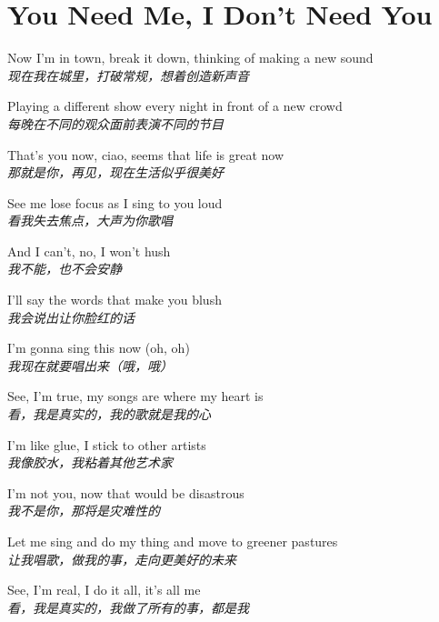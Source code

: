 \section{You Need Me, I Don't Need You}

\thispagestyle{empty}


\begin{spacing}{1.5}
\begin{flushleft}
Now I'm in town, break it down, thinking of making a new sound\\
\textit{现在我在城里，打破常规，想着创造新声音}\lyricspace

Playing a different show every night in front of a new crowd\\
\textit{每晚在不同的观众面前表演不同的节目}\lyricspace

That's you now, ciao, seems that life is great now\\
\textit{那就是你，再见，现在生活似乎很美好}\lyricspace

See me lose focus as I sing to you loud\\
\textit{看我失去焦点，大声为你歌唱}\lyricspace

And I can't, no, I won't hush\\
\textit{我不能，也不会安静}\lyricspace

I'll say the words that make you blush\\
\textit{我会说出让你脸红的话}\lyricspace

I'm gonna sing this now (oh, oh)\\
\textit{我现在就要唱出来（哦，哦）}\lyricspace

See, I'm true, my songs are where my heart is\\
\textit{看，我是真实的，我的歌就是我的心}\lyricspace

I'm like glue, I stick to other artists\\
\textit{我像胶水，我粘着其他艺术家}\lyricspace

I'm not you, now that would be disastrous\\
\textit{我不是你，那将是灾难性的}\lyricspace

Let me sing and do my thing and move to greener pastures\\
\textit{让我唱歌，做我的事，走向更美好的未来}\lyricspace

See, I'm real, I do it all, it's all me\\
\textit{看，我是真实的，我做了所有的事，都是我}\lyricspace


\end{flushleft}
\end{spacing}
